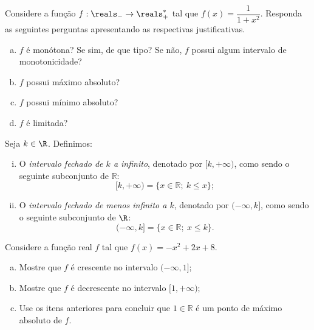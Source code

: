 \begin{exercise}
    Considere a função $f: \reals_- \to \reals^\ast_+$ tal que $f(x) = \dfrac{1}{1+x^2}$. Responda as seguintes perguntas apresentando as respectivas justificativas.
    \begin{enumerate}[a)]
	\item $f$ é monótona? Se sim, de que tipo? Se não, $f$ possui algum intervalo de monotonicidade?
	\item $f$ possui máximo absoluto?
	\item $f$ possui mínimo absoluto?
	\item $f$ é limitada?
    \end{enumerate}
\end{exercise}

\begin{exercise}
  Seja $k \in \R$. Definimos:
  \begin{enumerate}[i)]
    \item O \emph{intervalo fechado de $k$ a infinito}, denotado por $[k, + \infty)$, como sendo o seguinte subconjunto de $\mathbb R$: 
    $$ [k,+ \infty ) = \{ x \in \mathbb R ; \ k \leq x \};$$
    \item O \emph{intervalo fechado de menos infinito a $k$}, denotado por $(- \infty, k ]$, como sendo o seguinte subconjunto de $\R$:
    $$ (- \infty, k ] = \{ x \in \mathbb R ; \  x \leq k \}.$$
  \end{enumerate}

  Considere a função real $f$ tal que $f(x) = -x^2 +2x +8$.
\begin{enumerate}[a)]
\item Mostre que $f$ é crescente no intervalo $( - \infty , 1]$;
\item Mostre que $f$ é decrescente no intervalo $[1, + \infty )$;
\item Use os itens anteriores para concluir que $1 \in \mathbb R$ é um ponto de máximo absoluto de $f$.
\end{enumerate}  
\end{exercise}

